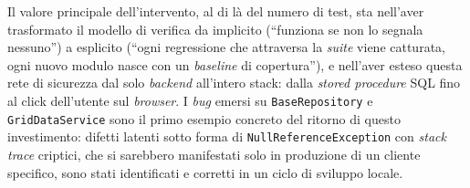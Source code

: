 Il valore principale dell'intervento, al di là del numero di test, sta nell'aver trasformato il modello di verifica da implicito (``funziona se non lo segnala nessuno'') a esplicito (``ogni regressione che attraversa la \emph{suite} viene catturata, ogni nuovo modulo nasce con un \emph{baseline} di copertura''), e nell'aver esteso questa rete di sicurezza dal solo \emph{backend} all'intero stack: dalla \emph{stored procedure} SQL fino al click dell'utente sul \emph{browser}. I \emph{bug} emersi su \texttt{BaseRepository} e \texttt{GridDataService} sono il primo esempio concreto del ritorno di questo investimento: difetti latenti sotto forma di \texttt{NullReferenceException} con \emph{stack trace} criptici, che si sarebbero manifestati solo in produzione di un cliente specifico, sono stati identificati e corretti in un ciclo di sviluppo locale.